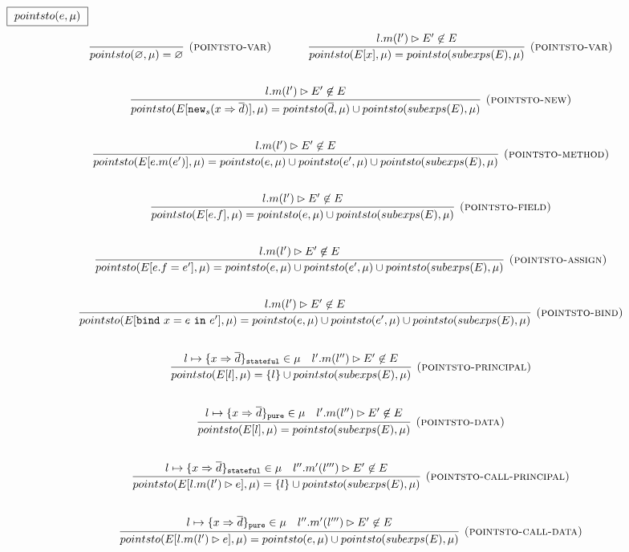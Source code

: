 \documentclass{llncs}
\newcommand{\keywadj}[1]{\mathtt{#1}}
\newcommand{\keyw}[1]{\keywadj{#1}~}
\begin{document}
$\fbox{$~pointsto(e, \mu)~$}$
\[
\begin{array}{c}
\infer[\textsc{(pointsto-var)}]
  {pointsto(\varnothing, \mu) = \varnothing}
  {}%
~~~~~~~~~~
\infer[\textsc{(pointsto-var)}]
  {pointsto(E[x],\mu) = pointsto(subexps(E), \mu)}
  {l.m(l') \rhd E' \not\in E}\\[5ex]
\infer[\textsc{(pointsto-new)}]
  {pointsto(E[\keywadj{new}_{s}(x \Rightarrow \overline{d})],\mu) = pointsto(\overline{d},\mu) \cup pointsto(subexps(E), \mu)}
  {l.m(l') \rhd E' \not\in E}\\[5ex]

\infer[\textsc{(pointsto-method)}]
  {pointsto(E[e.m(e')],\mu) = pointsto(e,\mu) \cup pointsto(e',\mu) \cup pointsto(subexps(E), \mu)}
  {l.m(l') \rhd E' \not\in E}\\[5ex]

\infer[\textsc{(pointsto-field)}]
  {pointsto(E[e.f],\mu) = pointsto(e,\mu) \cup pointsto(subexps(E), \mu)}
  {l.m(l') \rhd E' \not\in E}\\[5ex]

\infer[\textsc{(pointsto-assign)}]
  {pointsto(E[e.f = e'],\mu) = pointsto(e,\mu) \cup pointsto(e',\mu) \cup pointsto(subexps(E), \mu)}
  {l.m(l') \rhd E' \not\in E}\\[5ex]

\infer[\textsc{(pointsto-bind)}]
  {pointsto(E[\keyw{bind} x = e~\keyw{in} e'],\mu) = pointsto(e,\mu) \cup pointsto(e',\mu) \cup pointsto(subexps(E), \mu)}
  {l.m(l') \rhd E' \not\in E}\\[5ex]

\infer[\textsc{(pointsto-principal)}]
  {pointsto(E[l],\mu) = \{ l \} \cup pointsto(subexps(E), \mu)}
  {l \mapsto \{ x \Rightarrow \overline{d} \}_\keywadj{stateful} \in \mu & l'.m(l'') \rhd E' \not\in E}\\[5ex]
\infer[\textsc{(pointsto-data)}]
  {pointsto(E[l],\mu) = pointsto(subexps(E), \mu)}
  {l \mapsto \{ x \Rightarrow \overline{d} \}_\keywadj{pure} \in \mu & l'.m(l'') \rhd E' \not\in E}\\[5ex]

\infer[\textsc{(pointsto-call-principal)}]
  {pointsto(E[l.m(l') \rhd e],\mu) = \{ l \} \cup pointsto(subexps(E), \mu)}
  {l \mapsto \{ x \Rightarrow \overline{d} \}_\keywadj{stateful} \in \mu & l''.m'(l''') \rhd E' \not\in E}\\[5ex]

\infer[\textsc{(pointsto-call-data)}]
  {pointsto(E[l.m(l') \rhd e],\mu) = pointsto(e,\mu) \cup pointsto(subexps(E), \mu)}
  {l \mapsto \{ x \Rightarrow \overline{d} \}_\keywadj{pure} \in \mu & l''.m'(l''') \rhd E' \not\in E}\\[5ex]


\end{array}
\]
\end{document}
